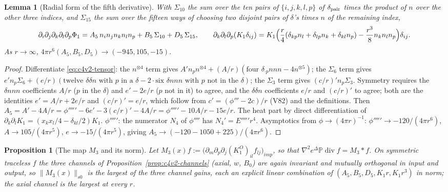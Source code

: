 \documentclass[11pt]{article}
\newcommand{\PP}{\mathbb P}
\theoremstyle{plain}
\newtheorem{proposition}[theorem]{Proposition}
\newtheorem{lemma}[theorem]{Lemma}
\theoremstyle{definition}
\theoremstyle{remark}
\begin{document}
\begin{lemma}[Radial form of the fifth derivative]
\label{lem:c4v4-fifth}
With \(\Sigma_{10}\) the sum over the ten pairs of \(\{i,j,k,l,p\}\) of \(\delta_{\rm pair}\) times
the product of \(n\) over the other three indices, and \(\Sigma_{15}\) the sum over
the fifteen ways of choosing two disjoint pairs of \(\delta\)'s times \(n\) of the
remaining index,
\begin{equation}
 \partial_i\partial_j\partial_k\partial_l\partial_p\Phi_1=A_5\,n_in_jn_kn_ln_p+B_5\,\Sigma_{10}+D_5\,\Sigma_{15},\qquad
 \partial_k\partial_l\partial_p(K_1\delta_{ij})=K_1\Bigl(\frac r4(\delta_{kp}n_l+\delta_{lp}n_k+\delta_{kl}n_p)-\frac{r^3}8n_kn_ln_p\Bigr)\delta_{ij} .
 \label{eq:c4v4-tensor}
\end{equation}
As \(r\to\infty\), \(4\pi r^6(A_5,B_5,D_5)\to(-945,105,-15)\).
\end{lemma}

\begin{proof}
Differentiate \eqref{eq:c4v2-tensor}: the \(n^{\otimes4}\) term gives
\(A'n_pn^{\otimes4}+(A/r)(\text{four }\delta_{\cdot p}nnn-4n^{\otimes5})\); the \(\Sigma_6\) term gives
\(e'n_p\Sigma_6+(e/r)(\text{twelve }\delta\delta n\text{ with }p\text{ in a }\delta-2\cdot\text{six }\delta nnn\text{ with }p\text{ not in the }\delta)\);
the \(\Sigma_3\) term gives \((c/r)'n_p\Sigma_3\).  Symmetry requires the \(\delta nnn\)
coefficients \(A/r\) (\(p\) in the \(\delta\)) and \(e'-2e/r\) (\(p\) not in it) to agree,
and the \(\delta\delta n\) coefficients \(e/r\) and \((c/r)'\) to agree; both are the
identities \(e'=A/r+2e/r\) and \((c/r)'=e/r\), which follow from
\(c'=(\phi'''-2c)/r\) (V82) and the definitions.  Then
\(A_5=A'-4A/r=\phi'''''-6e'-3(c/r)'-4A/r=\phi'''''-10A/r-15e/r\).  The heat part by
direct differentiation of \(\partial_k\partial_lK_1=(x_kx_l/4-\delta_{kl}/2)K_1\).  \(\phi'''''\): the
numerator \(N_4\) of \(\phi''''\) has \(N_4'=E'''''r^4\).  Asymptotics from
\(\phi\to(4\pi r)^{-1}\): \(\phi'''''\to-120/(4\pi r^6)\), \(A\to105/(4\pi r^5)\), \(e\to-15/(4\pi r^5)\), giving
\(A_5\to(-120-1050+225)/(4\pi r^6)\).
\end{proof}

\begin{proposition}[The map \(M_3\) and its norm]
\label{prop:c4v4-channels}
Let \(M_3(x)f:=\bigl(\partial_m\partial_p\partial_j(K^O_1)_{il}f_{lj}\bigr)_{imp}\), so that \(\nabla^2e^{\Delta}\PP\operatorname{div}f=M_3*f\).  On
symmetric traceless \(f\) the three channels of
Proposition~\ref{prop:c4v2-channels} (axial, \(w\), \(B_0\)) are again
invariant and mutually orthogonal in input and output, so
\(\|M_3(x)\|_{s0}\) is the largest of the three channel gains, each an
explicit linear combination of \((A_5,B_5,D_5,K_1r,K_1r^3)\) in norm; the
axial channel is the largest at every \(r\).
\end{proposition}
\end{document}
